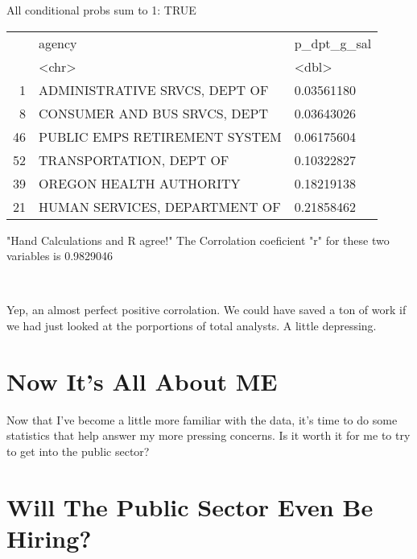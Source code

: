 \documentclass[letterpaper]{article}
\theoremstyle{definition}
\begin{document}
All conditional probs sum to 1:  TRUE

\begin{tabular}{r|ll}
  & agency & p\_dpt\_g\_sal\\
  & <chr> & <dbl>\\
\hline
	1 & ADMINISTRATIVE SRVCS, DEPT OF & 0.03561180\\
	8 & CONSUMER AND BUS SRVCS, DEPT  & 0.03643026\\
	46 & PUBLIC EMPS RETIREMENT SYSTEM & 0.06175604\\
	52 & TRANSPORTATION, DEPT OF       & 0.10322827\\
	39 & OREGON HEALTH AUTHORITY       & 0.18219138\\
	21 & HUMAN SERVICES, DEPARTMENT OF & 0.21858462\\
\end{tabular}


    
    

     "Hand Calculations and R agree!"
The Corrolation coeficient "r" for these two variables is  0.9829046
    
    \begin{center}
    \end{center}
    { \hspace*{\fill} \\}
    
    Yep, an almost perfect positive corrolation. We could have saved a ton
of work if we had just looked at the porportions of total analysts. A
little depressing.

    \hypertarget{now-its-all-about-me}{%
\section{Now It's All About ME}\label{now-its-all-about-me}}

Now that I've become a little more familiar with the data, it's time to
do some statistics that help answer my more pressing concerns. Is it
worth it for me to try to get into the public sector?

    \hypertarget{will-the-public-sector-even-be-hiring}{%
\section{Will The Public Sector Even Be
Hiring?}\label{will-the-public-sector-even-be-hiring}}
\end{document}
